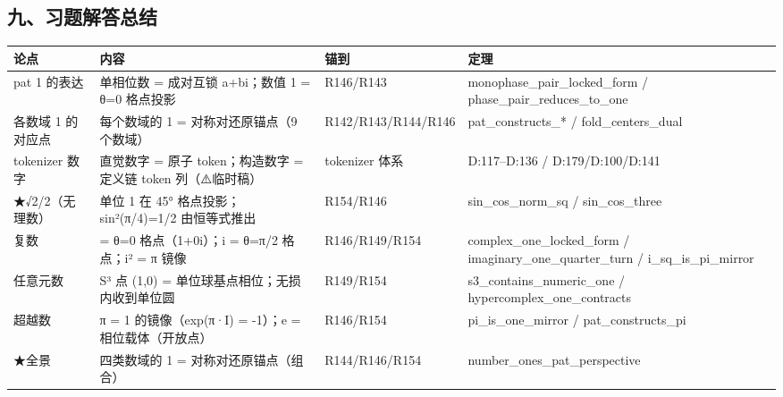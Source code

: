 \documentclass[
]{article}
\newcounter{none} %
\begin{document}
\subsection{九、习题解答总结}\label{ux4e5dux4e60ux9898ux89e3ux7b54ux603bux7ed3}

{\def\LTcaptype{none} %
\begin{longtable}[]{@{}
  >{\raggedright\arraybackslash}p{}
  >{\raggedright\arraybackslash}p{}
  >{\raggedright\arraybackslash}p{}
  >{\raggedright\arraybackslash}p{}@{}}
\toprule\noalign{}
\begin{minipage}[b]{\linewidth}\raggedright
论点
\end{minipage} & \begin{minipage}[b]{\linewidth}\raggedright
内容
\end{minipage} & \begin{minipage}[b]{\linewidth}\raggedright
锚到
\end{minipage} & \begin{minipage}[b]{\linewidth}\raggedright
定理
\end{minipage} \\
\midrule\noalign{}
\endhead
\bottomrule\noalign{}
\endlastfoot
pat 1 的表达 & 单相位数 = 成对互锁 a+bi；数值 1 = θ=0 格点投影 &
R146/R143 & monophase\_pair\_locked\_form /
phase\_pair\_reduces\_to\_one \\
各数域 1 的对应点 & 每个数域的 1 = 对称对还原锚点（9 个数域） &
R142/R143/R144/R146 & pat\_constructs\_* / fold\_centers\_dual \\
tokenizer 数字 & 直觉数字 = 原子 token；构造数字 = 定义链 token
列（⚠️临时稿） & tokenizer 体系 & D:117--D:136 / D:179/D:100/D:141 \\
★√2/2（无理数） & 单位 1 在 45° 格点投影；sin²(π/4)=1/2 由恒等式推出 &
R154/R146 & sin\_cos\_norm\_sq / sin\_cos\_three \\
复数 & 1 = θ=0 格点（1+0i）；i = θ=π/2 格点；i² = π 镜像 &
R146/R149/R154 & complex\_one\_locked\_form /
imaginary\_one\_quarter\_turn / i\_sq\_is\_pi\_mirror \\
任意元数 & S³ 点 (1,0) = 单位球基点相位；无损内收到单位圆 & R149/R154 &
s3\_contains\_numeric\_one / hypercomplex\_one\_contracts \\
超越数 & π = 1 的镜像（exp(π·I) = -1）；e = 相位载体（开放点） &
R146/R154 & pi\_is\_one\_mirror / pat\_constructs\_pi \\
★全景 & 四类数域的 1 = 对称对还原锚点（组合） & R144/R146/R154 &
number\_ones\_pat\_perspective \\
\end{longtable}
}
\end{document}
